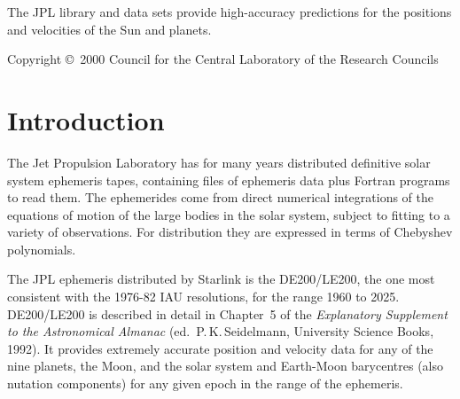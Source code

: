 \documentclass[twoside,11pt]{article}
\newcommand{\stardocinitials}  {SUN}
\newcommand{\stardoccopyright} 
{Copyright \copyright\ 2000 Council for the Central Laboratory of the Research Councils}
\newcommand{\stardocnumber}    {87.6}
\newcommand{\stardocabstract}  {
The JPL library and data sets provide high-accuracy predictions for 
the positions and velocities of the Sun and planets.}
\newcommand{\stardocname}{\stardocinitials /\stardocnumber}
\newenvironment{latexonly}{}{}
\newcommand{\xlabel}[1]{}
\renewcommand{\_}{\texttt{\symbol{95}}}
\renewcommand{\thepage}{\roman{page}}
\begin{document}
\stardocabstract

\begin{latexonly}
\newpage
\vspace*{\fill}
\stardoccopyright
\end{latexonly}

  \newpage
  \begin{latexonly}
    \setlength{\parskip}{0mm}
    \tableofcontents
    \setlength{\parskip}{\medskipamount}
    \markboth{\stardocname}{\stardocname}
  \end{latexonly}

\cleardoublepage
\renewcommand{\thepage}{\arabic{page}}
\setcounter{page}{1}


\section{\xlabel{introduction}Introduction}
\label{introduction}

The Jet Propulsion Laboratory has for many years distributed definitive
solar system ephemeris tapes, containing files of ephemeris data
plus Fortran programs to read them.  The ephemerides come from direct
numerical integrations of the equations of motion of the large bodies
in the solar system, subject to fitting to a variety of observations.
For distribution they are expressed in terms of Chebyshev polynomials.

The JPL ephemeris distributed by Starlink is the DE200/LE200, the one most
consistent with the 1976-82 IAU resolutions, for the range 1960 to 2025.
DE200/LE200 is described in detail in Chapter~5 of the \textit{Explanatory
Supplement to the Astronomical Almanac}\/ (ed.\ P.\,K.\,Seidelmann,
University Science Books, 1992).  It provides extremely accurate position
and velocity data for any of the nine planets, the Moon, and the solar
system and Earth-Moon barycentres (also nutation components) for any
given epoch in the range of the ephemeris.
\end{document}
